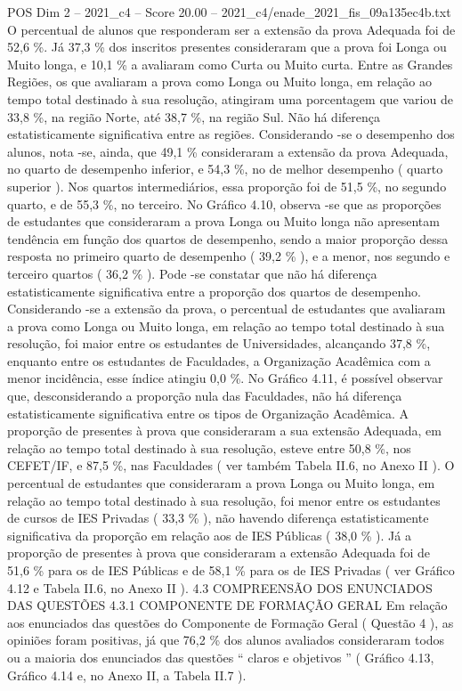 \begin{textsample}{POS Dim 2 – 2021\_c4 – Score 20.00 – 2021\_c4/enade\_2021\_fis\_09a135ec4b.txt}
O percentual de alunos que responderam ser a extensão da prova Adequada foi de 52,6 \%.
Já 37,3 \% dos inscritos presentes consideraram que a prova foi Longa ou Muito longa, e 10,1 \% a avaliaram como Curta ou Muito curta.
Entre as Grandes Regiões, os que avaliaram a prova como Longa ou Muito longa, em relação ao tempo total destinado à sua resolução, atingiram uma porcentagem que variou de 33,8 \%, na região Norte, até 38,7 \%, na região Sul.
Não há diferença estatisticamente significativa entre as regiões.
Considerando -se o desempenho dos alunos, nota -se, ainda, que 49,1 \% consideraram a extensão da prova Adequada, no quarto de desempenho inferior, e 54,3 \%, no de melhor desempenho ( quarto superior ).
Nos quartos intermediários, essa proporção foi de 51,5 \%, no segundo quarto, e de 55,3 \%, no terceiro.
No Gráfico 4.10, observa -se que as proporções de estudantes que consideraram a prova Longa ou Muito longa não apresentam tendência em função dos quartos de desempenho, sendo a maior proporção dessa resposta no primeiro quarto de desempenho ( 39,2 \% ), e a menor, nos segundo e terceiro quartos ( 36,2 \% ).
Pode -se constatar que não há diferença estatisticamente significativa entre a proporção dos quartos de desempenho.
Considerando -se a extensão da prova, o percentual de estudantes que avaliaram a prova como Longa ou Muito longa, em relação ao tempo total destinado à sua resolução, foi maior entre os estudantes de Universidades, alcançando 37,8 \%, enquanto entre os estudantes de Faculdades, a Organização Acadêmica com a menor incidência, esse índice atingiu 0,0 \%.
No Gráfico 4.11, é possível observar que, desconsiderando a proporção nula das Faculdades, não há diferença estatisticamente significativa entre os tipos de Organização Acadêmica.
A proporção de presentes à prova que consideraram a sua extensão Adequada, em relação ao tempo total destinado à sua resolução, esteve entre 50,8 \%, nos CEFET/IF, e 87,5 \%, nas Faculdades ( ver também Tabela II.6, no Anexo II ).
O percentual de estudantes que consideraram a prova Longa ou Muito longa, em relação ao tempo total destinado à sua resolução, foi menor entre os estudantes de cursos de IES Privadas ( 33,3 \% ), não havendo diferença estatisticamente significativa da proporção em relação aos de IES Públicas ( 38,0 \% ).
Já a proporção de presentes à prova que consideraram a extensão Adequada foi de 51,6 \% para os de IES Públicas e de 58,1 \% para os de IES Privadas ( ver Gráfico 4.12 e Tabela II.6, no Anexo II ). 4.3 COMPREENSÃO DOS ENUNCIADOS DAS QUESTÕES 4.3.1 COMPONENTE DE FORMAÇÃO GERAL Em relação aos enunciados das questões do Componente de Formação Geral ( Questão 4 ), as opiniões foram positivas, já que 76,2 \% dos alunos avaliados consideraram todos ou a maioria dos enunciados das questões “ claros e objetivos ” ( Gráfico 4.13, Gráfico 4.14 e, no Anexo II, a Tabela II.7 ).

\end{textsample}
